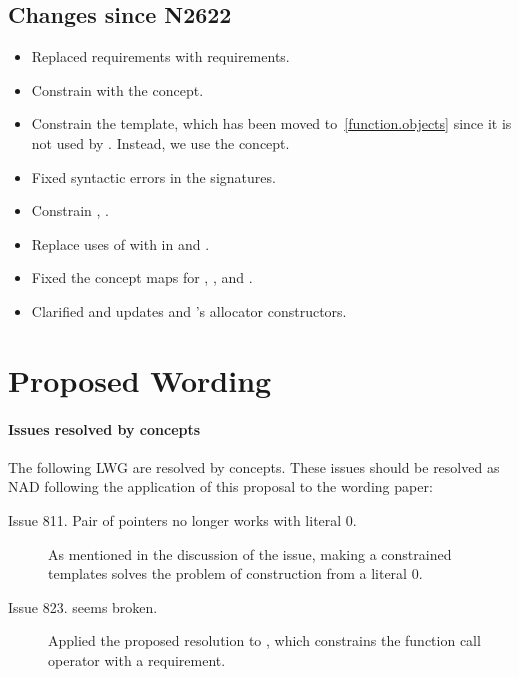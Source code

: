 \documentclass[american,twoside]{book}
\begin{document}
\begin{titlepage}
\section*{Changes since N2622}
\begin{itemize}
\item Replaced  requirements with  requirements.
\item Constrain  with the  concept.
\item Constrain the  template, which has been moved
  to~\ref{function.objects} since it is not used by
  . Instead, we use the  concept.
\item Fixed syntactic errors in the  signatures.
\item Constrain , .
\item Replace uses of  with
   in  and .
\item Fixed the  concept maps for ,
  , and .
\item Clarified and updates  and 's allocator
  constructors.
\end{itemize}

\end{titlepage}

\section*{Proposed Wording}
\paragraph*{Issues resolved by concepts}
The following LWG are resolved by concepts. These issues should be
resolved as NAD following the application of this proposal to the
wording paper:
\begin{description}
\item[Issue 811. Pair of pointers no longer works with literal 0.]  As
  mentioned in the discussion of the issue, making  a
  constrained templates solves the problem of construction from a
  literal 0.
\item[Issue 823.  seems broken.] Applied the proposed resolution to , which constrains the function call operator with a  requirement.
\end{description}
\end{document}
